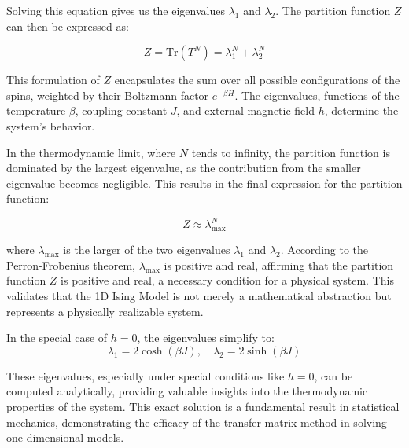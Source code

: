 Solving this equation gives us the eigenvalues \( \lambda_1 \) and \( \lambda_2
\). The partition function \( Z \) can then be expressed as:

\begin{equation}
Z = \text{Tr}(T^N) = \lambda_1^N + \lambda_2^N
\end{equation}

This formulation of \( Z \) encapsulates the sum over all possible
configurations of the spins, weighted by their Boltzmann factor \( e^{-\beta H}
\). The eigenvalues, functions of the temperature \( \beta \), coupling constant
\( J \), and external magnetic field \( h \), determine the system's behavior.

In the thermodynamic limit, where \( N \) tends to infinity, the partition
function is dominated by the largest eigenvalue, as the contribution from the
smaller eigenvalue becomes negligible. This results in the final expression for
the partition function:

\begin{equation}
Z \approx \lambda_{\text{max}}^N
\end{equation}

where \( \lambda_{\text{max}} \) is the larger of the two eigenvalues \(
\lambda_1 \) and \( \lambda_2 \). According to the Perron-Frobenius theorem, \(
\lambda_{\text{max}} \) is positive and real, affirming that the partition
function \( Z \) is positive and real, a necessary condition for a physical
system. This validates that the 1D Ising Model is not merely a mathematical
abstraction but represents a physically realizable system.

In the special case of \( h = 0 \), the eigenvalues simplify to:
\begin{equation}
 \lambda_1 = 2 \cosh(\beta J), \quad \lambda_2 = 2 \sinh(\beta J)
\end{equation}

These eigenvalues, especially under special conditions like \( h = 0 \), can be
computed analytically, providing valuable insights into the thermodynamic
properties of the system. This exact solution is a fundamental result in
statistical mechanics, demonstrating the efficacy of the transfer matrix method
in solving one-dimensional models.


